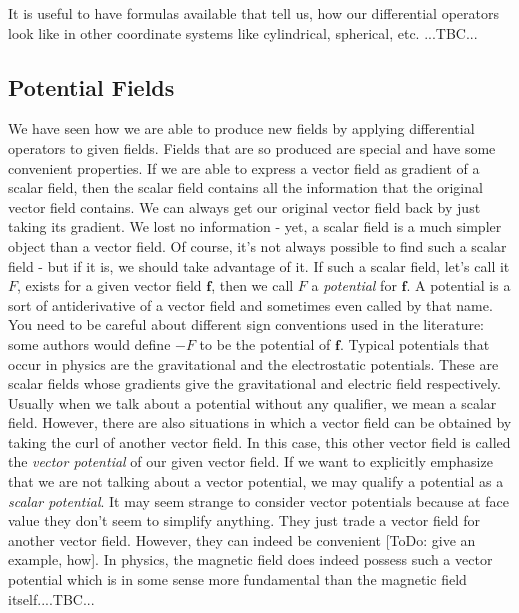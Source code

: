 It is useful to have formulas available that tell us, how our differential operators look like in other coordinate systems like cylindrical, spherical, etc.
...TBC...





\subsection{Potential Fields}
We have seen how we are able to produce new fields by applying differential operators to given fields. Fields that are so produced are special and have some convenient properties. If we are able to express a vector field as gradient of a scalar field, then the scalar field contains all the information that the original vector field contains. We can always get our original vector field back by just taking its gradient. We lost no information - yet, a scalar field is a much simpler object than a vector field. Of course, it's not always possible to find such a scalar field - but if it is, we should take advantage of it. If such a scalar field, let's call it $F$, exists for a given vector field $\mathbf{f}$, then we call $F$ a \emph{potential} for $\mathbf{f}$. A potential is a sort of antiderivative of a vector field and sometimes even called by that name. You need to be careful about different sign conventions used in the literature: some authors would define $-F$ to be the potential of $\mathbf{f}$. Typical potentials that occur in physics are the gravitational and the electrostatic potentials. These are scalar fields whose gradients give the gravitational and electric field respectively. Usually when we talk about a potential without any qualifier, we mean a scalar field. However, there are also situations in which a vector field can be obtained by taking the curl of another vector field. In this case, this other vector field is called the \emph{vector potential} of our given vector field. If we want to explicitly emphasize that we are not talking about a vector potential, we may qualify a potential as a \emph{scalar potential}. It may seem strange to consider vector potentials because at face value they don't seem to simplify anything. They just trade a vector field for another vector field. However, they can indeed be convenient [ToDo: give an example, how]. In physics, the magnetic field does indeed possess such a vector potential which is in some sense more fundamental than the magnetic field itself....TBC...

